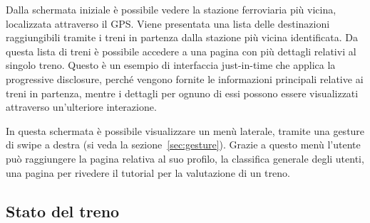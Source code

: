 Dalla schermata iniziale è possibile vedere la stazione ferroviaria più vicina, localizzata attraverso il GPS.
Viene presentata una lista delle destinazioni raggiungibili tramite i treni in partenza dalla stazione più vicina identificata. Da questa lista di treni è possibile accedere a una pagina con più dettagli relativi al singolo treno.
Questo è un esempio di interfaccia just-in-time che applica la progressive disclosure, perché vengono fornite le informazioni principali relative ai treni in partenza, mentre i dettagli per ognuno di essi possono essere visualizzati attraverso un'ulteriore interazione.

In questa schermata è possibile visualizzare un menù laterale, tramite una gesture di swipe a destra (si veda la sezione~\vref{sec:gesture}). Grazie a questo menù l'utente può raggiungere la pagina relativa al suo profilo, la classifica generale degli utenti, una pagina per rivedere il tutorial per la valutazione di un treno.

\subsection{Stato del treno}


